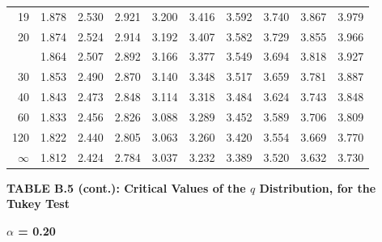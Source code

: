 \documentclass[10pt]{article}
\begin{document}
\begin{longtable}{@{}r!{\vrule width 0.8pt\hspace{0.55em}}rrrrrrrrr@{}}
19 & 1.878 & 2.530 & 2.921 & 3.200 & 3.416 & 3.592 & 3.740 & 3.867 & 3.979 \\
20 & 1.874 & 2.524 & 2.914 & 3.192 & 3.407 & 3.582 & 3.729 & 3.855 & 3.966 \\
 & 1.864 & 2.507 & 2.892 & 3.166 & 3.377 & 3.549 & 3.694 & 3.818 & 3.927 \\
30 & 1.853 & 2.490 & 2.870 & 3.140 & 3.348 & 3.517 & 3.659 & 3.781 & 3.887 \\
40 & 1.843 & 2.473 & 2.848 & 3.114 & 3.318 & 3.484 & 3.624 & 3.743 & 3.848 \\
60 & 1.833 & 2.456 & 2.826 & 3.088 & 3.289 & 3.452 & 3.589 & 3.706 & 3.809 \\
120 & 1.822 & 2.440 & 2.805 & 3.063 & 3.260 & 3.420 & 3.554 & 3.669 & 3.770 \\
\addlinespace[0.30em]
$\infty$ & 1.812 & 2.424 & 2.784 & 3.037 & 3.232 & 3.389 & 3.520 & 3.632 & 3.730 \\
\end{longtable}
\newpage
\thispagestyle{empty}
\begin{center}
{\large\bfseries TABLE B.5 (cont.): Critical Values of the $q$ Distribution, for the Tukey Test\par}
\end{center}
{\large\bfseries $\alpha$ = 0.20\par}
\vspace{0.45em}
\small
\end{document}
